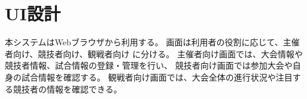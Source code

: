 \section{UI設計}
本システムはWebブラウザから利用する。
画面は利用者の役割に応じて、主催者向け、競技者向け、観戦者向け
に分ける。
主催者向け画面では、大会情報や競技者情報、試合情報の登録・管理を行い、
競技者向け画面では参加大会や自身の試合情報を確認する。
観戦者向け画面では、大会全体の進行状況や注目する競技者の情報を確認できる。

\begin{table}[H]
    \centering
    \caption{}
    \label{}
    \begin{tabular}{|l|l|l|l|}
    
    \end{tabular}
\end{table}